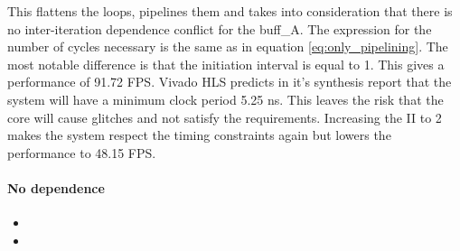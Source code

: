 This flattens the loops, pipelines them and takes into consideration that there is no inter-iteration dependence conflict for the buff\_A. The expression for the number of cycles necessary is the same as in equation \ref{eq:only_pipelining}. The most notable difference is that the initiation interval is equal to 1. This gives a performance of 91.72 FPS. Vivado HLS predicts in it's synthesis report that the system will have a minimum clock period 5.25 ns. This leaves the risk that the core will cause glitches and not satisfy the requirements. Increasing the II to 2 makes the system respect the timing constraints again but lowers the performance to 48.15 FPS. 

\paragraph{No dependence}

\begin{itemize}
\item {}
\item {}
\end{itemize}



\newpage





